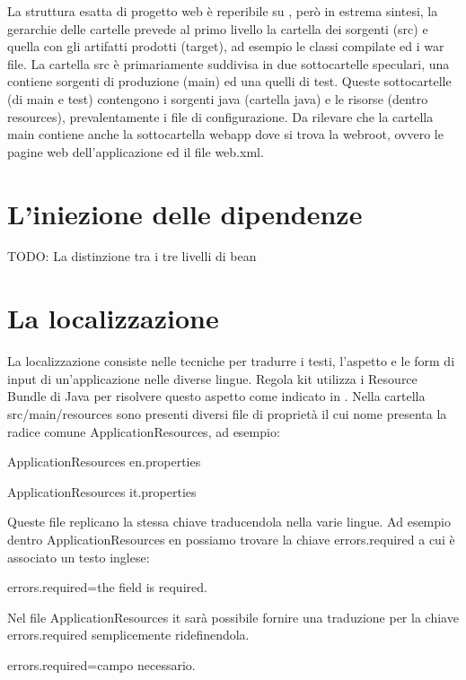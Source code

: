 La struttura esatta di progetto web è reperibile su \cite{maven}, però in estrema sintesi, la gerarchie delle cartelle prevede al primo livello la cartella dei sorgenti (src) e quella con gli artifatti prodotti (target), ad esempio le classi compilate ed i war file. La cartella src è primariamente suddivisa in due sottocartelle speculari, una contiene sorgenti di produzione (main) ed una quelli di test. Queste sottocartelle (di main e test) contengono i sorgenti java (cartella java) e le risorse (dentro resources), prevalentamente i file di configurazione. Da rilevare che la cartella main contiene anche la sottocartella webapp dove si trova la webroot, ovvero le pagine web dell'applicazione ed il file web.xml.


\section{L'iniezione delle dipendenze}
TODO: La distinzione tra i tre livelli di bean

\section{La localizzazione}
La localizzazione consiste nelle tecniche per tradurre i testi, l'aspetto e le form di input di un'applicazione nelle diverse lingue. Regola kit utilizza i Resource Bundle di Java per risolvere questo aspetto come indicato in \cite{i18n}. Nella cartella src/main/resources sono presenti diversi file  di proprietà il cui nome presenta la radice comune ApplicationResources, ad esempio:

\begin{itemize*}
  \item ApplicationResources en.properties
  \item ApplicationResources it.properties
\end{itemize*}


Queste file replicano la stessa chiave traducendola nella varie lingue. Ad esempio dentro ApplicationResources en possiamo trovare la chiave errors.required a cui è associato un testo inglese:

\begin{xml}
 errors.required=the field is required.
\end{xml}

Nel file ApplicationResources it sarà possibile fornire una traduzione per la chiave errors.required semplicemente ridefinendola.

\begin{xml}
 errors.required=campo necessario.
\end{xml}

